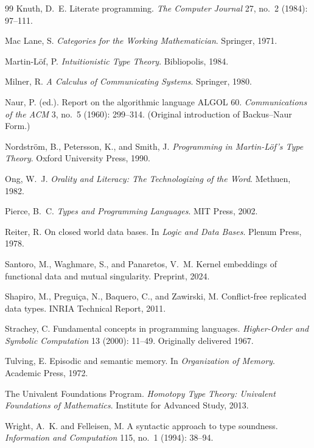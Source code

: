 \documentclass[12pt, a4paper, openany]{book}
\theoremstyle{plain}
\theoremstyle{definition}
\theoremstyle{remark}
\begin{document}
\begin{thebibliography}{99}
Knuth, D.~E. Literate programming. \emph{The Computer Journal} 27, no.~2
(1984): 97--111.

Mac Lane, S. \emph{Categories for the Working Mathematician}. Springer, 1971.

Martin-L\"of, P. \emph{Intuitionistic Type Theory}. Bibliopolis, 1984.

Milner, R. \emph{A Calculus of Communicating Systems}. Springer, 1980.

Naur, P. (ed.). Report on the algorithmic language ALGOL 60.
\emph{Communications of the ACM} 3, no.~5 (1960): 299--314.
(Original introduction of Backus--Naur Form.)

Nordstr\"om, B., Petersson, K., and Smith, J. \emph{Programming in
Martin-L\"of's Type Theory}. Oxford University Press, 1990.

Ong, W.~J. \emph{Orality and Literacy: The Technologizing of the Word}.
Methuen, 1982.

Pierce, B.~C. \emph{Types and Programming Languages}. MIT Press, 2002.

Reiter, R. On closed world data bases. In \emph{Logic and Data Bases}. Plenum
Press, 1978.

Santoro, M., Waghmare, S., and Panaretos, V.~M. Kernel embeddings of functional
data and mutual singularity. Preprint, 2024.

Shapiro, M., Pregui\c{c}a, N., Baquero, C., and Zawirski, M. Conflict-free
replicated data types. INRIA Technical Report, 2011.

Strachey, C. Fundamental concepts in programming languages. \emph{Higher-Order
and Symbolic Computation} 13 (2000): 11--49. Originally delivered 1967.

Tulving, E. Episodic and semantic memory. In \emph{Organization of Memory}.
Academic Press, 1972.

The Univalent Foundations Program. \emph{Homotopy Type Theory: Univalent
Foundations of Mathematics}. Institute for Advanced Study, 2013.

Wright, A.~K. and Felleisen, M. A syntactic approach to type soundness.
\emph{Information and Computation} 115, no.~1 (1994): 38--94.

\end{thebibliography}
\end{document}
